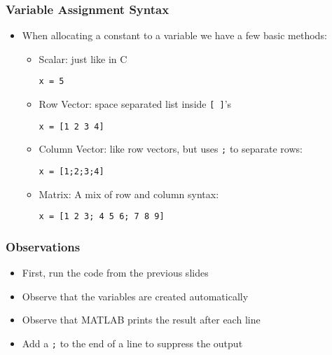 \documentclass[14pt]{beamer}
\begin{document}
\begin{frame}[fragile]
\frametitle{Variable Assignment Syntax}
\begin{itemize}
\item When allocating a constant to a variable we have a few basic methods:
	\begin{itemize}
		\item Scalar: just like in C
			\begin{lstlisting}[style=pseudo]
x = 5
\end{lstlisting}
		\item Row Vector: space separated list inside \texttt{[ ]}'s
\begin{lstlisting}[style=pseudo]
x = [1 2 3 4]		
\end{lstlisting}
		\item Column Vector: like row vectors, but uses \texttt{;} to separate rows:
\begin{lstlisting}[style=pseudo]
x = [1;2;3;4]
\end{lstlisting}
		\item Matrix: A mix of row and column syntax:
\begin{lstlisting}[style=pseudo]
x = [1 2 3; 4 5 6; 7 8 9]
\end{lstlisting}
	\end{itemize}
\end{itemize}
\end{frame}

\begin{frame}
\frametitle{Observations}
\begin{itemize}
\item First, run the code from the previous slides
\pause
\item Observe that the variables are created automatically
\pause
\item Observe that MATLAB prints the result after each line
\item Add a \texttt{;} to the end of a line to suppress the output
\end{itemize}
\end{frame}
\end{document}

